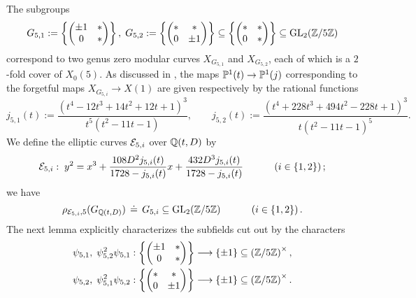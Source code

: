 The subgroups
\begin{equation} \label{defofG51andG52}
G_{5,1} := \left\{ \begin{pmatrix} \pm 1 & * \\ 0 & * \end{pmatrix} \right\}, \; G_{5,2} := \left\{ \begin{pmatrix} * & * \\ 0 & \pm 1 \end{pmatrix} \right\} \subseteq \left\{ \begin{pmatrix} * & * \\ 0 & * \end{pmatrix} \right\} \subseteq \operatorname{GL}_2(\mathbb{Z}/5\mathbb{Z})
\end{equation}
correspond to two genus zero modular curves $X_{G_{5,1}}$ and $X_{G_{5,2}}$, each of which is a $2$-fold cover of $X_0(5)$.
As discussed in \cite{zywina}, the maps $\mathbb{P}^1(t) \rightarrow \mathbb{P}^1(j)$ corresponding to the forgetful maps $X_{G_{5,i}} \longrightarrow X(1)$ are given respectively by the rational functions
\[
j_{5,1}(t) := \frac{(t^4 - 12t^3 + 14t^2 + 12t + 1)^3}{t^5(t^2 - 11t - 1)}, \quad\quad
j_{5,2}(t) :=  \frac{(t^4 + 228t^3 + 494t^2 - 228t + 1)^3}{t(t^2 - 11t - 1)^5}.
\]
We define the elliptic curves $\mathcal{E}_{5,i}$ over $\mathbb{Q}(t,D)$ by
\begin{equation} \label{level5genericellipticcurve}
\mathcal{E}_{5,i} : \; y^2 = x^3 + \frac{108D^2 j_{5,i}(t)}{1728 - j_{5,i}(t)} x + \frac{432D^3 j_{5,i}(t)}{1728 - j_{5,i}(t)} \quad\quad\quad \left( i \in \{ 1, 2 \} \right);
\end{equation}
we have
\begin{equation} \label{genericGaloisimageiscontainedinborelmod5}
\rho_{\mathcal{E}_{5,i},5}(G_{\mathbb{Q}(t,D)}) \, \doteq \, G_{5,i} \subseteq \operatorname{GL}_2(\mathbb{Z}/5\mathbb{Z}) \quad\quad\quad \left( i \in \{ 1, 2 \} \right).
\end{equation}
The next lemma explicitly characterizes the subfields cut out by the characters
\begin{equation*} \label{defofpsisforlevel5}
\begin{split}
\psi_{5,1}, \; \psi_{5,2}^2\psi_{5,1} : \left\{ \begin{pmatrix} \pm 1 & * \\ 0 & * \end{pmatrix} \right\} &\longrightarrow \{ \pm 1 \} \subseteq \left( \mathbb{Z}/5\mathbb{Z} \right)^\times, \\
\psi_{5,2}, \; \psi_{5,1}^2\psi_{5,2} : \left\{ \begin{pmatrix} * & * \\ 0 & \pm 1 \end{pmatrix} \right\} &\longrightarrow \{ \pm 1 \} \subseteq \left( \mathbb{Z}/5\mathbb{Z} \right)^\times.
\end{split}
\end{equation*}
